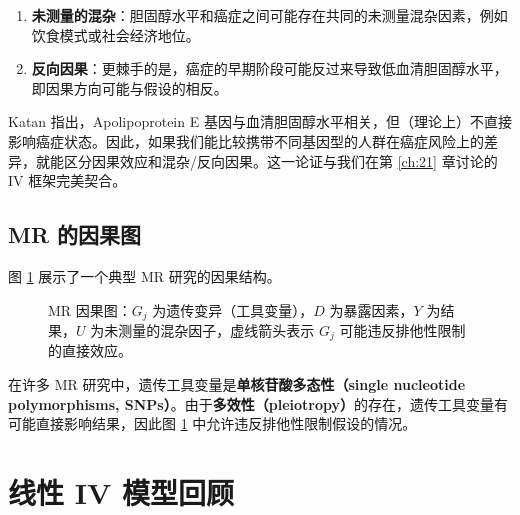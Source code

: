 \begin{enumerate}
  \item \textbf{未测量的混杂}：胆固醇水平和癌症之间可能存在共同的未测量混杂因素，例如饮食模式或社会经济地位。
  \item \textbf{反向因果}：更棘手的是，癌症的早期阶段可能反过来导致低血清胆固醇水平，即因果方向可能与假设的相反。
\end{enumerate}

Katan \citep{Katan1986} 指出，Apolipoprotein E 基因与血清胆固醇水平相关，但（理论上）不直接影响癌症状态。因此，如果我们能比较携带不同基因型的人群在癌症风险上的差异，就能区分因果效应和混杂/反向因果。这一论证与我们在第 \ref{ch:21} 章讨论的 IV 框架完美契合。

\subsection{MR 的因果图}\label{sec:25-causal-graph}

图 \ref{fig:25-mr-causal-graph} 展示了一个典型 MR 研究的因果结构。

\begin{figure}[htbp]
\centering
\caption{MR 因果图：$G_j$ 为遗传变异（工具变量），$D$ 为暴露因素，$Y$ 为结果，$U$ 为未测量的混杂因子，虚线箭头表示 $G_j$ 可能违反排他性限制的直接效应。}
\label{fig:25-mr-causal-graph}
\end{figure}

在许多 MR 研究中，遗传工具变量是\textbf{单核苷酸多态性（single nucleotide polymorphisms, SNPs）}。由于\textbf{多效性（pleiotropy）}的存在，遗传工具变量有可能直接影响结果，因此图 \ref{fig:25-mr-causal-graph} 中允许违反排他性限制假设的情况。

\section{线性 IV 模型回顾}\label{sec:25-linear-iv-model}

